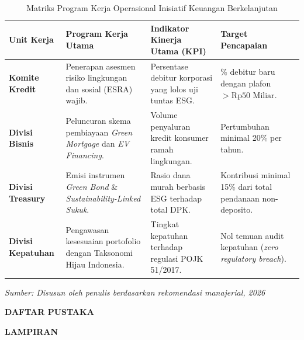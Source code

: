 \documentclass[12pt,a4paper]{article}
\numberwithin{equation}{section}
\begin{document}
\begin{table}[H]
  \caption{Matriks Program Kerja Operasional Inisiatif Keuangan Berkelanjutan}
  \label{tab:program_aksi}
  \small
  \begin{tabularx}{\textwidth}{|>{\raggedright\arraybackslash}p{2.5cm}|>{\raggedright\arraybackslash}X|>{\raggedright\arraybackslash}X|>{\raggedright\arraybackslash}X|}
    \hline
    \textbf{Unit Kerja} & \textbf{Program Kerja Utama} & \textbf{Indikator Kinerja Utama (KPI)} & \textbf{Target Pencapaian} \\
    \hline
    \textbf{Komite Kredit} & Penerapan asesmen risiko lingkungan dan sosial (ESRA) wajib. & Persentase debitur korporasi yang lolos uji tuntas ESG. & 100\% debitur baru dengan plafon $> \text{Rp}50\text{ Miliar}$. \\
    \hline
    \textbf{Divisi Bisnis} & Peluncuran skema pembiayaan \emph{Green Mortgage} dan \emph{EV Financing}. & Volume penyaluran kredit konsumer ramah lingkungan. & Pertumbuhan minimal 20\% per tahun. \\
    \hline
    \textbf{Divisi Treasury} & Emisi instrumen \emph{Green Bond} \& \emph{Sustainability-Linked Sukuk}. & Rasio dana murah berbasis ESG terhadap total DPK. & Kontribusi minimal 15\% dari total pendanaan non-deposito. \\
    \hline
    \textbf{Divisi Kepatuhan} & Pengawasan kesesuaian portofolio dengan Taksonomi Hijau Indonesia. & Tingkat kepatuhan terhadap regulasi POJK 51/2017. & Nol temuan audit kepatuhan (\emph{zero regulatory breach}). \\
    \hline
  \end{tabularx}
  \begin{flushleft}
    \textit{Sumber: Disusun oleh penulis berdasarkan rekomendasi manajerial, 2026}
  \end{flushleft}
\end{table}

\newpage
{}
\begin{center}
  {\large\bfseries DAFTAR PUSTAKA}
\end{center}

\vspace{0.5cm}


\newpage
{}
\begin{center}
  {\large\bfseries LAMPIRAN}
\end{center}
\end{document}
